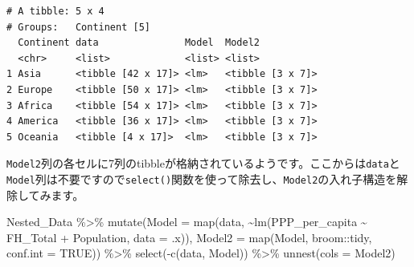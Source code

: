 \documentclass[
  a4paper,
  pandoc,
  ja=standard,
  jafont=haranoaji]{bxjsbook}
\newenvironment{Shaded}{\begin{snugshade}}{\end{snugshade}}
\newcommand{\AttributeTok}[1]{\textcolor[rgb]{0.00,0.48,0.65}{#1}}
\newcommand{\ConstantTok}[1]{\textcolor[rgb]{0.56,0.35,0.01}{#1}}
\newcommand{\FunctionTok}[1]{\textcolor[rgb]{0.28,0.35,0.67}{#1}}
\newcommand{\NormalTok}[1]{\textcolor[rgb]{0.00,0.48,0.65}{#1}}
\newcommand{\SpecialCharTok}[1]{\textcolor[rgb]{0.37,0.37,0.37}{#1}}
\begin{document}
\begin{verbatim}
# A tibble: 5 x 4
# Groups:   Continent [5]
  Continent data               Model  Model2          
  <chr>     <list>             <list> <list>          
1 Asia      <tibble [42 x 17]> <lm>   <tibble [3 x 7]>
2 Europe    <tibble [50 x 17]> <lm>   <tibble [3 x 7]>
3 Africa    <tibble [54 x 17]> <lm>   <tibble [3 x 7]>
4 America   <tibble [36 x 17]> <lm>   <tibble [3 x 7]>
5 Oceania   <tibble [4 x 17]>  <lm>   <tibble [3 x 7]>
\end{verbatim}

\texttt{Model2}列の各セルに7列のtibbleが格納されているようです。ここからは\texttt{data}と\texttt{Model}列は不要ですので\texttt{select()}関数を使って除去し、\texttt{Model2}の入れ子構造を解除してみます。

\begin{Shaded}
\begin{Highlighting}[numbers=left,,]
\NormalTok{Nested\_Data }\SpecialCharTok{\%\textgreater{}\%}
  \FunctionTok{mutate}\NormalTok{(}\AttributeTok{Model  =} \FunctionTok{map}\NormalTok{(data, }
                      \SpecialCharTok{\textasciitilde{}}\FunctionTok{lm}\NormalTok{(PPP\_per\_capita }\SpecialCharTok{\textasciitilde{}}\NormalTok{ FH\_Total }\SpecialCharTok{+}\NormalTok{ Population, }
                          \AttributeTok{data =}\NormalTok{ .x)),}
         \AttributeTok{Model2 =} \FunctionTok{map}\NormalTok{(Model, broom}\SpecialCharTok{::}\NormalTok{tidy, }\AttributeTok{conf.int =} \ConstantTok{TRUE}\NormalTok{)) }\SpecialCharTok{\%\textgreater{}\%}
  \FunctionTok{select}\NormalTok{(}\SpecialCharTok{{-}}\FunctionTok{c}\NormalTok{(data, Model)) }\SpecialCharTok{\%\textgreater{}\%}
  \FunctionTok{unnest}\NormalTok{(}\AttributeTok{cols =}\NormalTok{ Model2)}
\end{Highlighting}
\end{Shaded}
\end{document}
